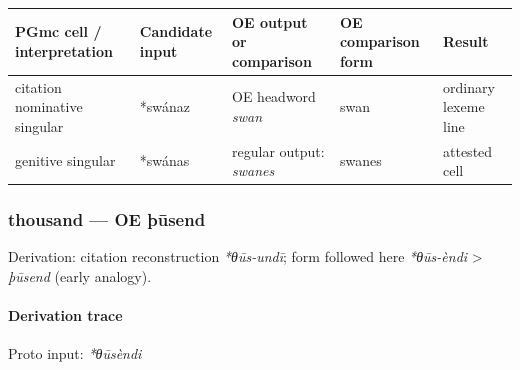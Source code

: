 \documentclass[
  british,
  a4paper,
]{article}
\newcounter{none} %
\begin{document}
{\def\LTcaptype{none} %
\begin{longtable}[]{@{}
  >{\raggedright\arraybackslash}p{}
  >{\raggedright\arraybackslash}p{}
  >{\raggedright\arraybackslash}p{}
  >{\raggedright\arraybackslash}p{}
  >{\raggedright\arraybackslash}p{}@{}}
\toprule\noalign{}
\begin{minipage}[b]{\linewidth}\raggedright
PGmc cell / interpretation
\end{minipage} & \begin{minipage}[b]{\linewidth}\raggedright
Candidate input
\end{minipage} & \begin{minipage}[b]{\linewidth}\raggedright
OE output or comparison
\end{minipage} & \begin{minipage}[b]{\linewidth}\raggedright
OE comparison form
\end{minipage} & \begin{minipage}[b]{\linewidth}\raggedright
Result
\end{minipage} \\
\midrule\noalign{}
\endhead
\bottomrule\noalign{}
\endlastfoot
citation nominative singular & *swánaz & OE headword \emph{swan} & swan
& ordinary lexeme line \\
genitive singular & *swánas & regular output: \emph{swanes} & swanes &
attested cell \\
\end{longtable}
}

\subsubsection{thousand --- OE þūsend}\label{thousand-oe-uxfeux16bsend}

Derivation: citation reconstruction \emph{*θūs-undī}; form followed here
\emph{*θūs-èndi} \textgreater{} \emph{þūsend} (early analogy).

\paragraph{Derivation trace}\label{derivation-trace-30}

Proto input: \emph{*θūsèndi}

\begingroup
\setlength{\fboxsep}{6pt}
\end{document}
